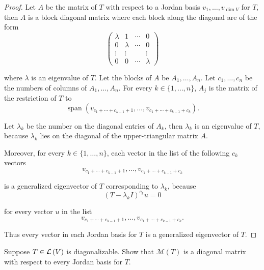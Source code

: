 \begin{proof}
    Let $A$ be the matrix of $T$ with respect to a Jordan basis $v_{1}, \ldots, v_{\dim V}$ for $T$, then $A$ is a block diagonal matrix where each block along the diagonal are of the form
    \[
        \begin{pmatrix}
            \lambda & 1       & \cdots & 0       \\
            0       & \lambda & \cdots & 0       \\
            \vdots  & \vdots  &        & \vdots  \\
            0       & 0       & \cdots & \lambda
        \end{pmatrix}
    \]

    where $\lambda$ is an eigenvalue of $T$. Let the blocks of $A$ be $A_{1}, \ldots, A_{n}$. Let $c_{1}, \ldots, c_{n}$ be the numbers of columns of $A_{1}, \ldots, A_{n}$. For every $k\in\{1,\ldots,n\}$, $A_{j}$ is the matrix of the restriction of $T$ to
    \[
        \operatorname{span}(v_{c_{1} + \cdots + c_{k-1}+1}, \ldots, v_{c_{1} + \cdots + c_{k-1} + c_{k}}).
    \]

    Let $\lambda_{k}$ be the number on the diagonal entries of $A_{k}$, then $\lambda_{k}$ is an eigenvalue of $T$, because $\lambda_{k}$ lies on the diagonal of the upper-triangular matrix $A$.

    Moreover, for every $k\in\{1,\ldots,n\}$, each vector in the list of the following $c_{k}$ vectors
    \[
        v_{c_{1} + \cdots + c_{k-1}+1}, \ldots, v_{c_{1} + \cdots + c_{k-1} + c_{k}}
    \]

    is a generalized eigenvector of $T$ corresponding to $\lambda_{k}$, because
    \[
        {(T - \lambda_{k}I)}^{c_{k}}u = 0
    \]

    for every vector $u$ in the list
    \[
        v_{c_{1} + \cdots + c_{k-1}+1}, \ldots, v_{c_{1} + \cdots + c_{k-1} + c_{k}}.
    \]

    Thus every vector in each Jordan basis for $T$ is a generalized eigenvector of $T$.
\end{proof}
\newpage

\begin{exercise}\label{chapter8:sectionC:exercise12}
    Suppose $T \in \mathcal{L}\left({V}\right)$ is diagonalizable. Show that $\mathcal{M}(T)$ is a diagonal matrix with respect to every Jordan basis for $T$.
\end{exercise}

